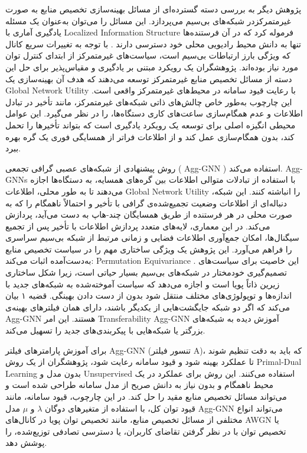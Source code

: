 پژوهش دیگر به بررسی دسته گسترده‌ای از مسائل بهینه‌سازی تخصیص منابع به صورت غیرمتمرکزدر شبکه‌های بی‌سیم می‌پردازد. این مسائل را می‌توان به‌عنوان یک مسئله یادگیری آماری با 
\gls{Localized Information Structure}
 فرموله کرد که در آن فرستنده‌ها تنها به دانش محیط رادیویی محلی خود دسترسی دارند . با توجه به تغییرات سریع کانال که ویژگی بارز ارتباطات بی‌سیم است، سیاست‌های غیرمتمرکز از ابتدای کنترل توان مورد نیاز بوده‌اند.
پژوهشگران یک رویکرد مبتنی بر یادگیری و مقیاس‌پذیر برای حل این دسته از مسائل تخصیص منابع غیرمتمرکز توسعه می‌دهند که هدف آن بهینه‌سازی یک  
\gls{Global Network Utility}
 با رعایت قیود سامانه در محیط‌های غیرمتمرکز واقعی است. این چارچوب به‌طور خاص چالش‌های ذاتی شبکه‌های غیرمتمرکز، مانند تأخیر در تبادل اطلاعات و عدم همگام‌سازی ساعت‌های کاری دستگاه‌ها، را در نظر می‌گیرد. این عوامل محیطی انگیزه اصلی برای توسعه یک رویکرد یادگیری است که بتواند تأخیرها را تحمل کند، بدون همگام‌سازی عمل کند و از اطلاعات فراتر از همسایگی فوری یک گره بهره ببرد.
 
روش پیشنهادی از شبکه‌های عصبی گرافی تجمعی (
\gls{Agg-GNN}
) استفاده می‌کند. Agg-GNNs با استفاده از تبادلات متوالی اطلاعات بین گره‌های همسایه، به دستگاه‌ها اجازه می‌دهند تا به طور محلی، اطلاعات 
\gls{Global Network Utility}
 را انباشته کنند. این شبکه، دنباله‌ای از اطلاعات وضعیت تجمیع‌شده‌ی گرافی با تأخیر و احتمالاً ناهمگام را که به صورت محلی در هر فرستنده از طریق همسایگان چند-هاپ به دست می‌آید، پردازش می‌کند. در این معماری، لایه‌های متعدد پردازش اطلاعات با تأخیر پس از تجمیع سیگنال‌ها، امکان جمع‌آوری اطلاعات فضایی و زمانی مرتبط از شبکه بی‌سیم سراسری را فراهم می‌آورد.
این پژوهش یک ویژگی ساختاری مهم را در سیاست تخصیص منابع به‌دست‌آمده اثبات می‌کند: 
\gls{Permutation Equivariance}
. این خاصیت برای سیاست‌های تصمیم‌گیری خودمختار در شبکه‌های بی‌سیم بسیار حیاتی است، زیرا شکل ساختاری زیرین ذاتاً پویا است و اجازه می‌دهد که سیاست آموخته‌شده به شبکه‌های جدید با اندازه‌ها و توپولوژی‌های مختلف منتقل شود بدون از دست دادن بهینگی. قضیه ۱ بیان می‌کند که اگر دو شبکه جایگشت‌هایی از یکدیگر باشند، دارای همان فیلترهای بهینه‌ی 
\gls{Agg-GNN}
هستند. این امر 
\gls{Transferability}
\gls{Agg-GNN}
 آموزش دیده به شبکه‌های بزرگتر یا شبکه‌هایی با پیکربندی‌های جدید را تسهیل می‌کند.

برای آموزش پارامترهای فیلتر 
\gls{Agg-GNN}
 (تنسور فیلتر A)، که باید به دقت تنظیم شوند تا عملکرد بهینه شود و قیود سامانه رعایت شود، پژوهشگران از یک روش 
\gls{Primal-Dual Learning}
  بدون مدل و 
\gls{Unsupervised}
   استفاده می‌کنند. این روش برای عملکرد در یک محیط ناهمگام و بدون نیاز به دانش صریح از مدل سامانه طراحی شده است و می‌تواند مسائل تخصیص منابع مقید را حل کند. در این چارچوب، قیود سامانه، مانند قیود توان کل، با استفاده از متغیرهای دوگان $\lambda$ و $\mu$	 
مدل 
\gls{Agg-GNN}
 می‌تواند انواع مختلفی از مسائل تخصیص منابع، مانند تخصیص توان پویا در کانال‌های 
\gls{AWGN}
  یا تخصیص توان با در نظر گرفتن تقاضای کاربران، یا دسترسی تصادفی توزیع‌شده، را پوشش دهد.
  
